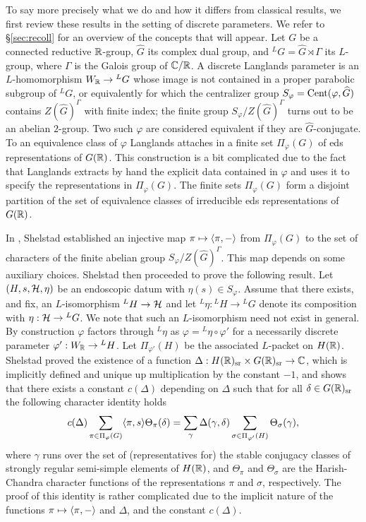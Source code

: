 \documentclass{article}
\theoremstyle{definition}
\numberwithin{equation}{section}
\renewcommand{\-}{\hyp{}}
\begin{document}
To say more precisely what we do and how it differs from classical results, we first review these results in the setting of discrete parameters. We refer to \S\ref{sec:recoll} for an overview of the concepts that will appear. Let $G$ be a connected reductive $\mathbb{R}$-group, $\hat G$ its complex dual group, and $^LG=\hat G \rtimes \Gamma$ its $L$\-group, where $\Gamma$ is the Galois group of $\mathbb{C}/\mathbb{R}$. A discrete Langlands parameter is an $L$\-homomorphism $W_{\mathbb{R}} \to {^LG}$ whose image is not contained in a proper parabolic subgroup of $^LG$, or equivalently for which the centralizer group $S_\varphi=\textrm{Cent}(\varphi,\widehat G)$ contains $Z(\hat G)^\Gamma$ with finite index; the finite group $S_\varphi/Z(\hat G)^\Gamma$ turns out to be an abelian $2$-group. Two such $\varphi$ are considered equivalent if they are $\hat G$-conjugate. To an equivalence class of $\varphi$ Langlands attaches in \cite[\S3]{Lan89} a finite set $\Pi_\varphi(G)$ of eds representations of $G(\mathbb{R})$. This construction is a bit complicated due to the fact that Langlands extracts by hand the explicit data contained in $\varphi$ and uses it to specify the representations in $\Pi_\varphi(G)$. The finite sets $\Pi_\varphi(G)$ form a disjoint partition of the set of equivalence classes of irreducible eds representations of $G(\mathbb{R})$.

In \cite{She82}, Shelstad established an injective map $\pi \mapsto \langle\pi,-\rangle$ from $\Pi_\varphi(G)$ to the set of characters of the finite abelian group $S_\varphi/Z(\hat G)^\Gamma$. This map depends on some auxiliary choices. Shelstad then proceeded to prove the following result. Let $(H,s,\mathcal{H},\eta)$ be an endoscopic datum with $\eta(s) \in S_\varphi$. Assume that there exists, and fix, an $L$\-isomorphism $^LH \to \mathcal{H}$ and let $^L\eta : {^LH} \to {^LG}$ denote its composition with $\eta : \mathcal{H} \to {^LG}$. We note that such an $L$\-isomorphism need not exist in general. By construction $\varphi$ factors through $^L\eta$ as $\varphi = {^L\eta}\circ\varphi'$ for a necessarily discrete parameter $\varphi' : W_{\mathbb{R}} \to {^LH}$. Let $\Pi_{\varphi'}(H)$ be the associated $L$\-packet on $H(\mathbb{R})$. Shelstad proved the existence of a function $\Delta : H(\mathbb{R})_{\textrm{sr}} \times G(\mathbb{R})_{\textrm{sr}} \to \mathbb{C}$, which is implicitly defined and unique up multiplication by the constant $-1$, and shows that there exists a constant $c(\Delta)$ depending on $\Delta$ such that for all $\delta \in G(\mathbb{R})_{\textrm{sr}}$ the following character identity holds
\begin{equation} \label{eq:s1}
c(\Delta)\sum_{\pi \in \Pi_\varphi(G)}\langle\pi,s\rangle\Theta_\pi(\delta) = \sum_\gamma \Delta(\gamma,\delta)\sum_{\sigma \in \Pi_{\varphi'}(H)} \Theta_{\sigma}(\gamma),
\end{equation}
where $\gamma$ runs over the set of (representatives for) the stable conjugacy classes of strongly regular semi-simple elements of $H(\mathbb{R})$, and $\Theta_\pi$ and $\Theta_\sigma$ are the Harish-Chandra character functions of the representations $\pi$ and $\sigma$, respectively. The proof of this identity is rather complicated due to the implicit nature of the functions $\pi \mapsto \langle\pi,-\rangle$ and $\Delta$, and the constant $c(\Delta)$.
\end{document}
